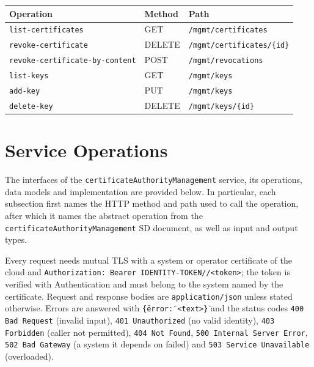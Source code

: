 \documentclass[a4paper]{arrowhead}
\begin{document}
\noindent\begin{longtable}{| p{5.2cm} | p{1.6cm} | p{8.4cm} |} \hline
\rowcolor{gray!33} Operation & Method & Path \\ \hline \endhead
\texttt{list-\allowbreak{}certificates} & GET & \texttt{/\allowbreak{}mgmt/\allowbreak{}certificates} \\ \hline
\texttt{revoke-\allowbreak{}certificate} & DELETE & \texttt{/\allowbreak{}mgmt/\allowbreak{}certificates/\allowbreak{}\{id\}} \\ \hline
\texttt{revoke-\allowbreak{}certificate-\allowbreak{}by-\allowbreak{}content} & POST & \texttt{/\allowbreak{}mgmt/\allowbreak{}revocations} \\ \hline
\texttt{list-\allowbreak{}keys} & GET & \texttt{/\allowbreak{}mgmt/\allowbreak{}keys} \\ \hline
\texttt{add-\allowbreak{}key} & PUT & \texttt{/\allowbreak{}mgmt/\allowbreak{}keys} \\ \hline
\texttt{delete-\allowbreak{}key} & DELETE & \texttt{/\allowbreak{}mgmt/\allowbreak{}keys/\allowbreak{}\{id\}} \\ \hline
\end{longtable}

\newpage

\section{Service Operations}
\label{sec:operations}

The interfaces of the \texttt{certificate\allowbreak{}Authority\allowbreak{}Management} service, its operations, data models and implementation are provided below.
In particular, each subsection first names the HTTP method and path used to call the operation, after which it names the abstract operation from the \texttt{certificate\allowbreak{}Authority\allowbreak{}Management} SD document, as well as input and output types.

Every request needs mutual TLS with a system or operator certificate of the cloud and \texttt{Authorization: Bearer IDENTITY-TOKEN//<token>}; the token is verified with Authentication and must belong to the system named by the certificate. Request and response bodies are \texttt{application/json} unless stated otherwise.
Errors are answered with \texttt{\{\"error\": \"<text>\"\}} and the status codes \texttt{400 Bad Request} (invalid input), \texttt{401 Unauthorized} (no valid identity), \texttt{403 Forbidden} (caller not permitted), \texttt{404 Not Found}, \texttt{500 Internal Server Error}, \texttt{502 Bad Gateway} (a system it depends on failed) and \texttt{503 Service Unavailable} (overloaded).
\end{document}

